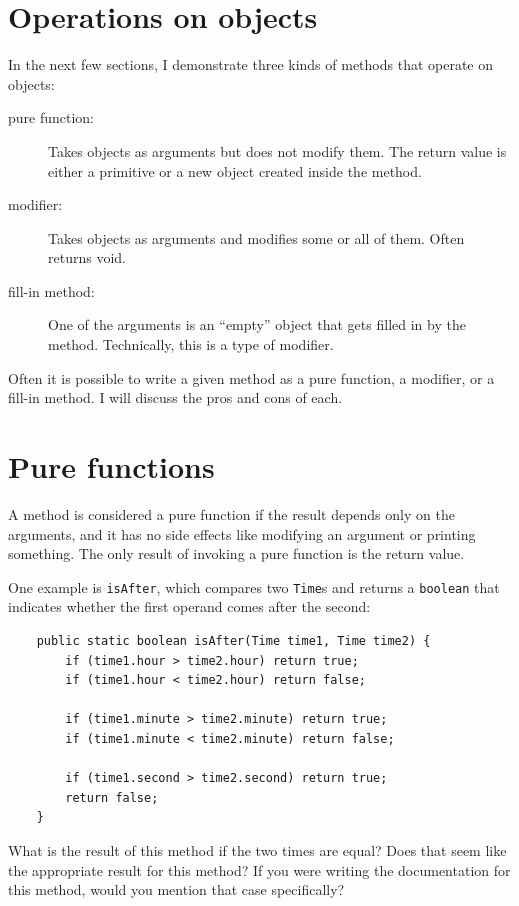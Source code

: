 \documentclass[12pt]{book}
\theoremstyle{exercise}
\begin{document}
\section{Operations on objects}
\label{objectops}

In the next few
sections, I demonstrate three kinds of methods that
operate on objects:

\begin{description}

\item[pure function:]  Takes objects as
arguments but does not modify them.  The return value is
either a primitive or a new object created inside the method.

\item[modifier:]  Takes objects as arguments and modifies some
or all of them.  Often returns void. 

\item[fill-in method:]  One of the arguments is an ``empty''
object that gets filled in by the method.  Technically, this is
a type of modifier.

\end{description}

Often it is possible to write a given method as a pure function, a modifier,
or a fill-in method.  I will discuss the pros and cons of each.


\section{Pure functions}

A method is considered a pure function if the result depends only on
the arguments, and it has no side effects like modifying an argument
or printing something.  The only result of invoking a pure function is
the return value.

One example is {\tt isAfter}, which compares two {\tt Time}s and
returns a {\tt boolean} that indicates whether the first operand
comes after the second:

\begin{lstlisting}
    public static boolean isAfter(Time time1, Time time2) {
        if (time1.hour > time2.hour) return true;
        if (time1.hour < time2.hour) return false;

        if (time1.minute > time2.minute) return true;
        if (time1.minute < time2.minute) return false;

        if (time1.second > time2.second) return true;
        return false;
    }
\end{lstlisting}
%
What is the result of this method if the two times are equal?  Does
that seem like the appropriate result for this method?  If you were
writing the documentation for this method, would you mention that case
specifically?
\end{document}
